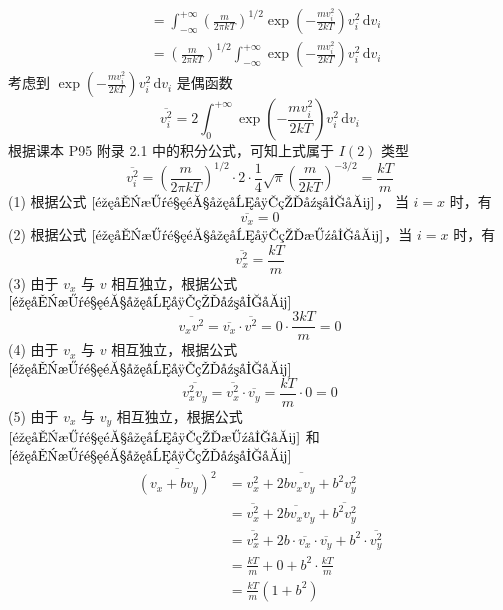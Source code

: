 \begin{solution}
\begin{equation}
\begin{aligned}
             & = \int_{-\infty}^{+\infty} \left(\frac{m}{2\pi kT}\right)^{1/2} \exp\left(-\frac{mv_i^2}{2kT}\right) v_i^2 \,\mathrm{d}v_i \\
             & = \left(\frac{m}{2\pi kT}\right)^{1/2} \int_{-\infty}^{+\infty} \exp\left(-\frac{mv_i^2}{2kT}\right) v_i^2 \,\mathrm{d}v_i
        \end{aligned}
    \end{equation}
    考虑到 $\displaystyle \exp\left(-\frac{mv_i^2}{2kT}\right) v_i^2 \,\mathrm{d}v_i$ 是偶函数
    \begin{equation}
        \overline{v_i^2} = 2 \int_{0}^{+\infty}\exp\left(-\frac{mv_i^2}{2kT}\right) v_i^2 \,\mathrm{d}v_i
    \end{equation}
    根据课本 P95 附录 2.1 中的积分公式，可知上式属于 $I(2)$ 类型
    \begin{equation}
        \label{麦克斯韦速度分布的方均值}
        \overline{v_i^2}
        = \left(\frac{m}{2\pi kT}\right)^{1/2} \cdot 2 \cdot \frac{1}{4} \sqrt{\pi} \left(\frac{m}{2kT}\right)^{-3/2}
        =\frac{kT}{m}
    \end{equation}
    (1) 根据公式 $\eqref{麦克斯韦速度分布的平均值}$， 当 $i = x$ 时，有
    $$
        \overline{v_x} = 0
    $$
    (2) 根据公式 $\eqref{麦克斯韦速度分布的方均值}$，当 $i = x$ 时，有
    $$
        \overline{v_x^2} =\frac{kT}{m}
    $$
    (3) 由于 $v_x$ 与 $v$ 相互独立，根据公式 $\eqref{麦克斯韦速度分布的平均值}$
    $$
        \overline{v_x v^2} = \overline{v_x} \cdot \overline{v^2} = 0 \cdot \frac{3kT}{m} = 0
    $$
    (4) 由于 $v_x$ 与 $v$ 相互独立，根据公式 $\eqref{麦克斯韦速度分布的平均值}$
    $$
        \overline{v_x^2 v_y} = \overline{v_x^2} \cdot \overline{v_y} = \frac{kT}{m} \cdot 0 = 0
    $$
    (5) 由于 $v_x$ 与 $v_y$ 相互独立，根据公式 $\eqref{麦克斯韦速度分布的方均值}$ 和 $\eqref{麦克斯韦速度分布的平均值}$
    $$
        \begin{aligned}
            \overline{(v_x + bv_y)^2}
             & = \overline{v_x^2 + 2bv_xv_y + b^2v_y^2}                                                       \\
             & = \overline{v_x^2} + \overline{2bv_xv_y} + \overline{b^2v_y^2}                                 \\
             & = \overline{v_x^2} + 2b \cdot \overline{v_x} \cdot \overline{v_y} + b^2 \cdot \overline{v_y^2} \\
             & = \frac{kT}{m} + 0 + b^2 \cdot \frac{kT}{m}                                                    \\
             & = \frac{kT}{m}(1+b^2)
        \end{aligned}
    $$
\end{solution}

